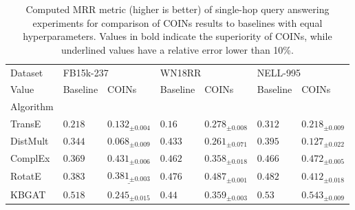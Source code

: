 \begin{table}[H]
  \caption[Computed MRR metric of single-hop query answering experiments.]{Computed MRR metric (higher is better) of single-hop query answering experiments for comparison of COINs results to baselines with equal hyperparameters. Values in bold indicate the superiority of COINs, while underlined values have a relative error lower than 10\%.}
  \label{tab:performance_query_answering_mrr}
  \centering
\begin{tabular}{lllllll}
\toprule
Dataset & \multicolumn{2}{l}{FB15k-237} & \multicolumn{2}{l}{WN18RR} & \multicolumn{2}{l}{NELL-995} \\
Value &                 Baseline &                              COINs &                Baseline &                           COINs &                 Baseline &                           COINs \\
Algorithm &                          &                                    &                         &                                 &                          &                                 \\
\midrule
TransE    &              ${{0.218}}$ &            ${{0.132}_{\pm 0.004}}$ &              ${{0.16}}$ &  $\mathbf{{0.278}_{\pm 0.008}}$ &              ${{0.312}}$ &         ${{0.218}_{\pm 0.009}}$ \\
DistMult  &              ${{0.344}}$ &            ${{0.068}_{\pm 0.009}}$ &             ${{0.433}}$ &         ${{0.261}_{\pm 0.071}}$ &              ${{0.395}}$ &         ${{0.127}_{\pm 0.022}}$ \\
ComplEx   &              ${{0.369}}$ &     $\mathbf{{0.431}_{\pm 0.006}}$ &             ${{0.462}}$ &         ${{0.358}_{\pm 0.018}}$ &              ${{0.466}}$ &  $\mathbf{{0.472}_{\pm 0.005}}$ \\
RotatE    &              ${{0.383}}$ &  $\underline{{0.381}_{\pm 0.003}}$ &             ${{0.476}}$ &  $\mathbf{{0.487}_{\pm 0.001}}$ &              ${{0.482}}$ &         ${{0.412}_{\pm 0.018}}$ \\
KBGAT     &              ${{0.518}}$ &            ${{0.245}_{\pm 0.015}}$ &              ${{0.44}}$ &         ${{0.359}_{\pm 0.003}}$ &               ${{0.53}}$ &  $\mathbf{{0.543}_{\pm 0.009}}$ \\
\bottomrule
\end{tabular}
\end{table}

